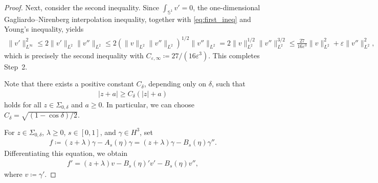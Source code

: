\documentclass{article}
\theoremstyle{remark}
\theoremstyle{definition}
\numberwithin{equation}{section}
\begin{document}
\begin{proof}
Next, consider the second inequality.
Since $\int_{\mathbb{S}^1}v'=0$, the one-dimensional Gagliardo--Nirenberg interpolation inequality, together with \eqref{eq:first_ineq} and Young's inequality, yields
\begin{align*}
    \|v'\|_{L^\infty}^2
    \le2\|v'\|_{L^2}\|v''\|_{L^2}
    \le2\left(\|v\|_{L^2}\|v''\|_{L^2}\right)^{1/2}\|v''\|_{L^2}
    =2\|v\|_{L^2}^{1/2}\|v''\|_{L^2}^{3/2}
    \le\frac{27}{16\varepsilon^3}\|v\|_{L^2}^2 + \varepsilon\|v''\|_{L^2}^2,
\end{align*}
which is precisely the second inequality with $C_{\varepsilon,\infty}\coloneqq27/(16\varepsilon^3)$. This completes Step~2.

Note that there exists a positive constant $C_\delta$, depending only on $\delta$, such that
\begin{align}
    |z+a|\ge C_\delta(|z|+a)
    \label{eq:abs_below}
\end{align}
holds for all $z\in\Sigma_{0,\delta}$ and $a\ge0$.
In particular, we can choose $C_\delta=\sqrt{(1-\cos\delta)/2}$.

For $z\in\Sigma_{0,\delta}$, $\lambda\ge0$, $s\in[0,1]$, and $\gamma\in H^3$, set
\begin{align*}
    f\coloneqq(z+\lambda)\gamma-A_s(\eta)\gamma=(z+\lambda)\gamma - B_s(\eta)\gamma''.
\end{align*}
Differentiating this equation, we obtain
\begin{align}
    f'=(z+\lambda)v - B_s(\eta)'v' - B_s(\eta)v'',
    \label{eq:f'}
\end{align}
where $v\coloneqq\gamma'$.


\end{proof}
\end{document}
